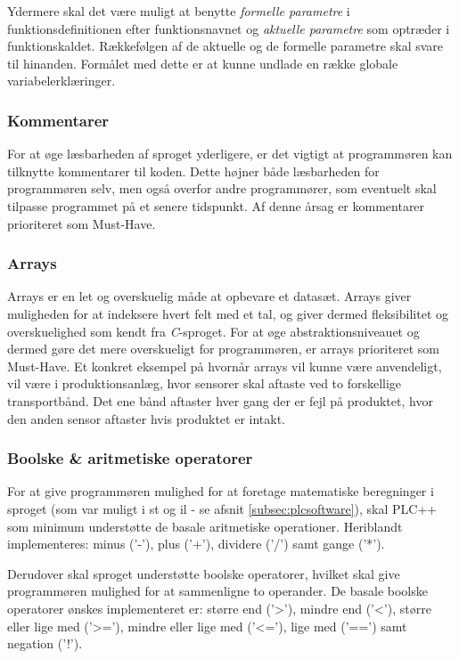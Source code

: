 Ydermere skal det være muligt at benytte \textit{formelle parametre} i funktionsdefinitionen efter funktionsnavnet og \textit{aktuelle parametre} som optræder i funktionskaldet. Rækkefølgen af de aktuelle og de formelle parametre skal svare til hinanden. Formålet med dette er at kunne undlade en række globale variabelerklæringer. 

\subsubsection{Kommentarer}
For at øge læsbarheden af sproget yderligere, er det vigtigt at programmøren kan tilknytte kommentarer til koden. Dette højner både læsbarheden for programmøren selv, men også overfor andre programmører, som eventuelt skal tilpasse programmet på et senere tidspunkt. Af denne årsag er kommentarer prioriteret som Must-Have. 

\subsubsection{Arrays}
Arrays er en let og overskuelig måde at opbevare et datasæt. Arrays giver muligheden for at indeksere hvert felt med et tal, og giver dermed fleksibilitet og overskuelighed som kendt fra \textit{C}-sproget. For at øge abstraktionsniveauet og dermed gøre det mere overskueligt for programmøren, er arrays prioriteret som Must-Have. Et konkret eksempel på hvornår arrays vil kunne være anvendeligt, vil være i produktionsanlæg, hvor sensorer skal aftaste ved to forskellige transportbånd. Det ene bånd aftaster hver gang der er fejl på produktet, hvor den anden sensor aftaster hvis produktet er intakt. 

\subsubsection{Boolske \& aritmetiske operatorer} 
For at give programmøren mulighed for at foretage matematiske beregninger i sproget (som var muligt i \gls{st} og \gls{il} - se afsnit \ref{subsec:plcsoftware}), skal PLC++ som minimum understøtte de basale aritmetiske operationer. Heriblandt implementeres: minus ('-'), plus ('+'), dividere ('/') samt gange ('*').

Derudover skal sproget understøtte boolske operatorer, hvilket skal give programmøren mulighed for at sammenligne to operander. De basale boolske operatorer ønskes implementeret er: større end ('>'), mindre end ('<'), større eller lige med ('>='), mindre eller lige med ('<='), lige med ('==') samt negation ('!').

